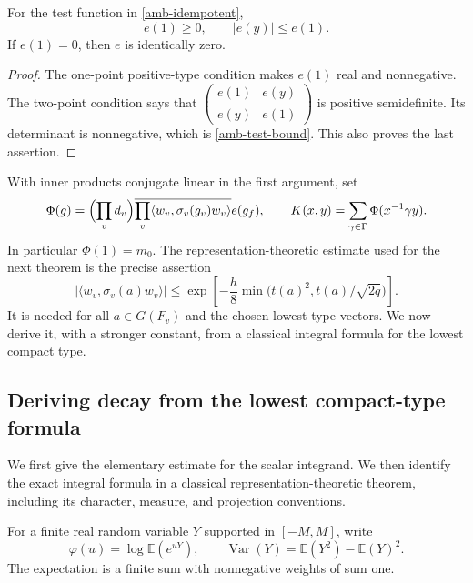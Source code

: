 \begin{lemma}\label{amb-positive-type}
For the test function in \eqref{amb-idempotent},
\begin{equation}\label{amb-test-bound}
                         e(1)\ge0,\qquad |e(y)|\le e(1).
\end{equation}
If $e(1)=0$, then $e$ is identically zero.
\end{lemma}
\begin{proof}
The one-point positive-type condition makes $e(1)$ real and
nonnegative. The two-point condition says that
$\begin{pmatrix}e(1)&e(y)\\\overline{e(y)}&e(1)\end{pmatrix}$
is positive semidefinite. Its determinant is nonnegative, which
is \eqref{amb-test-bound}. This also proves the last assertion.
\end{proof}

With inner products conjugate linear in the first argument, set
\begin{equation}\label{amb-kernel-function}
 \Phi(g)=\Bigl(\prod_vd_v\Bigr)
          \overline{\prod_v\langle w_v,\sigma_v(g_v)w_v\rangle}
                 e(g_f),\qquad
 K(x,y)=\sum_{\gamma\in\Gamma}\Phi(x^{-1}\gamma y).
\end{equation}
In particular $\Phi(1)=m_0$. The representation-theoretic
estimate used for the next theorem is the precise assertion
\begin{equation}\label{amb-decay-input}
 |\langle w_v,\sigma_v(a)w_v\rangle|
       \le\exp\left[-\frac h8
                 \min\bigl(t(a)^2,t(a)/\sqrt{2q}\bigr)\right].
\end{equation}
It is needed for all $a\in G(F_v)$ and the chosen lowest-type
vectors. We now derive it, with a stronger constant, from a
classical integral formula for the lowest compact type.

\subsection{Deriving decay from the lowest compact-type formula}

We first give the elementary estimate for the scalar integrand.
We then identify the exact integral formula in a classical
representation-theoretic theorem, including its character,
measure, and projection conventions.

For a finite real random variable $Y$ supported in $[-M,M]$,
write
\[
 \varphi(u)=\log\mathbb E(e^{uY}),\qquad
 \operatorname{Var}(Y)=\mathbb E(Y^2)-\mathbb E(Y)^2.
\]
The expectation is a finite sum with nonnegative weights of sum one.

